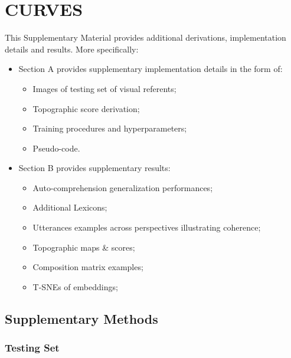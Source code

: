 
\chapter{CURVES}

This Supplementary Material provides additional derivations, implementation details and results. More specifically: 
\begin{itemize}[noitemsep]
\item Section A provides supplementary implementation details in the form of:
    \begin{itemize}[noitemsep]
    \item Images of testing set of visual referents;
    \item Topographic score derivation;
    \item Training procedures and hyperparameters;
    \item Pseudo-code.
\end{itemize}

\item Section B provides supplementary results:
    \begin{itemize}[noitemsep]
    \item Auto-comprehension generalization performances;
    \item Additional Lexicons;
    \item Utterances examples across perspectives illustrating coherence;
    \item Topographic maps \& scores;
    \item Composition matrix examples;
    \item T-SNEs of embeddings;
\end{itemize}
\end{itemize}

\section{Supplementary Methods}

\subsection{Testing Set}



